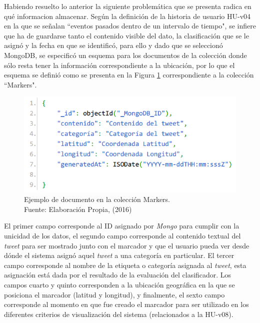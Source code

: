 Habiendo resuelto lo anterior la siguiente problemática que se presenta radica en qué informacion almacenar. Según la definición de la historia de usuario HU-v04 en la que se señalan ``eventos pasados dentro de un intervalo de tiempo", se infiere que ha de guardarse tanto el contenido visible del dato, la clasificación que se le asignó y la fecha en que se identificó, para ello y dado que se seleccionó MongoDB, se especificó un esquema para los documentos de la colección donde sólo resta tener la información correspondiente a la ubicación, por lo que el esquema se definió como se presenta en la Figura \ref{fig:esquemaMarker1} correspondiente a la colección ``Markers".

\begin{figure}[H]
	\centering
	\captionsetup{justification=centering}
	\includegraphics[scale=0.8]{images/Marker1.png}
	\caption[Ejemplo de documento en la colección Markers.]{Ejemplo de documento en la colección Markers.\\Fuente: Elaboración Propia, (2016)}
	\label{fig:esquemaMarker1}
\end{figure}

El primer campo corresponde al ID asignado por \textit{Mongo} para cumplir con la unicidad de los datos, el segundo campo corresponde al contenido textual del \textit{tweet} para ser mostrado junto con el marcador y que el usuario pueda ver desde dónde el sistema asignó aquel \textit{tweet} a una categoría en particular. El tercer campo corresponde al nombre de la etiqueta o categoría asignada al \textit{tweet}, esta asignación está dada por el resultado de la evaluación del clasificador. Los campos cuarto y quinto corresponden a la ubicación geográfica en la que se posiciona el marcador (latitud y longitud), y finalmente, el sexto campo corresponde al momento en que fue creado el marcador para ser utilizado en los diferentes criterios de visualización del sistema (relacionados a la HU-v08).

